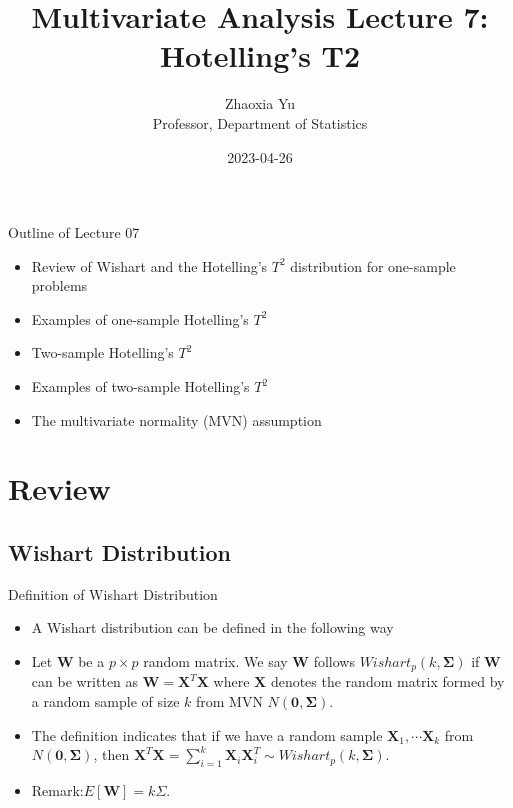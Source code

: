 \documentclass[
  ignorenonframetext,
]{beamer}
\title{Multivariate Analysis Lecture 7: Hotelling's T2}
\author{Zhaoxia Yu\\
Professor, Department of Statistics}
\date{2023-04-26}
\providecommand{\tightlist}{%
  \setlength{\itemsep}{0pt}\setlength{\parskip}{0pt}}
\begin{document}
\frame{\titlepage}

\begin{frame}{Outline of Lecture 07}
\protect\hypertarget{outline-of-lecture-07}{}
\begin{itemize}
\tightlist
\item
  Review of Wishart and the Hotelling's \(T^2\) distribution for
  one-sample problems
\item
  Examples of one-sample Hotelling's \(T^2\)
\item
  Two-sample Hotelling's \(T^2\)
\item
  Examples of two-sample Hotelling's \(T^2\)
\item
  The multivariate normality (MVN) assumption
\end{itemize}
\end{frame}

\hypertarget{review}{%
\section{Review}\label{review}}

\hypertarget{wishart-distribution}{%
\subsection{Wishart Distribution}\label{wishart-distribution}}

\begin{frame}{Definition of Wishart Distribution}
\protect\hypertarget{definition-of-wishart-distribution}{}
\begin{itemize}
\item
  A Wishart distribution can be defined in the following way
\item
  Let \(\mathbf W\) be a \(p\times p\) random matrix. We say
  \(\mathbf W\) follows \(Wishart_{p}(k, \boldsymbol \Sigma)\) if
  \(\mathbf W\) can be written as \(\mathbf W=\mathbf X^T \mathbf X\)
  where \(\mathbf X\) denotes the random matrix formed by a random
  sample of size \(k\) from MVN \(N(\mathbf 0, \boldsymbol \Sigma)\).
\item
  The definition indicates that if we have a random sample
  \(\mathbf X_1, \cdots \mathbf X_k\) from
  \(N(\mathbf 0, \boldsymbol \Sigma)\), then
  \(\mathbf X^T \mathbf X=\sum_{i=1}^k \mathbf X_i \mathbf X_i^T \sim Wishart_p(k, \boldsymbol \Sigma)\).
\item
  Remark:\(E[\mathbf W]=k\Sigma\).
\end{itemize}
\end{frame}
\end{document}
